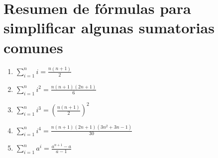 \section{Resumen de fórmulas para simplificar algunas sumatorias comunes}

\begin{enumerate}
  \item $ \sum_{i=1}^{n}{i} =  \frac{n (n+1)}{2} $
  \item $ \sum_{i=1}^{n}{i^2} =  \frac{n (n+1)(2n+1)}{6} $
  \item $ \sum_{i=1}^{n}{i^3} =  (\frac{n (n+1)}{2})^2 $
  \item $ \sum_{i=1}^{n}{i^4} =  \frac{n (n+1) (2n+1)(3n^2+ 3n-1)}{30} $
  \item $ \sum_{i=1}^{n}{a^i} = \frac{a^{n+1}-a}{a-1}$
\end{enumerate}